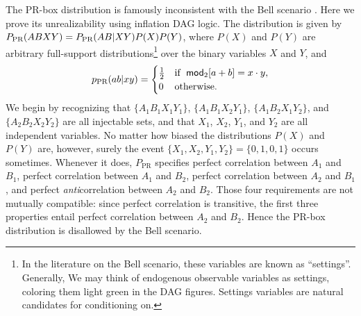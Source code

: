The \citet{PROriginal} PR-box distribution is famously inconsistent with the Bell scenario \cite{PROriginal,PRUnit}. Here we prove its unrealizability using inflation DAG logic. The distribution  is given by ${P_{\text{PR}}}\parenths{A B X Y} = P_{\text{PR}}\parenths{A B | X Y} P(X) P(Y)$, where $P(X)$ and $P(Y)$ are arbitrary full-support distributions\footnote{In the literature on the Bell scenario, these variables are known as ``settings''. Generally, We may think of endogenous observable variables as settings, coloring them light green in the DAG figures. Settings variables are natural candidates for conditioning on.} over the binary variables $X$ and $Y$, and
\begin{align}\begin{split}\label{eq:PRbox}
p_{\text{PR}}\parens{a b |x y}=\begin{cases}\tfrac{1}{2}&\text{if }\; \SmallNamedFunction[2]{mod}{a+b}=x\cdot y, \\ 0&\text{otherwise}.\end{cases}
\end{split}\end{align}
We begin by recognizing that $\{A_1 B_1 X_1 Y_1\}$, $\{A_1 B_1 X_2 Y_1\}$, $\{A_1 B_2 X_1 Y_2\}$, and $\{A_2 B_2 X_2 Y_2\}$ are all injectable sets, and that $X_1$, $X_2$, $Y_1$, and $Y_2$ are all independent variables.
No matter how biased the distributions $P(X)$ and $P(Y)$ are, however, surely the event $\{X_1, X_2, Y_1, Y_2\}=\{0, 1, 0, 1\}$  occurs sometimes. Whenever it does, $P_{\text{PR}}$ specifies perfect correlation between $A_1$ and $B_1$, perfect correlation between $A_1$ and $B_2$, perfect correlation between $A_2$ and $B_1$, and perfect \emph{anti}correlation between $A_2$ and $B_2$. Those four requirements are not mutually compatible: since perfect correlation is transitive, the first three properties entail perfect correlation between $A_2$ and $B_2$. Hence the PR-box distribution is disallowed by the Bell scenario.

